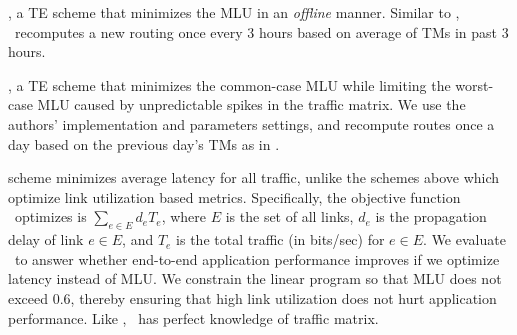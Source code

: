 {\bf{\mplsavg}}, a TE scheme that minimizes the MLU in an {\em offline} manner. Similar to \optwt, \mplsavg\ recomputes a new routing once every 3 hours based on average of TMs in past 3 hours.


{\bf{\cope}}, a TE scheme that minimizes the common-case MLU while limiting the worst-case MLU caused by unpredictable spikes in the traffic matrix. We use the authors' implementation and parameters settings, and recompute routes once a day based on the previous day's TMs  as in \cite{COPE}.


{\bf{\mindelay}} scheme minimizes average latency for all traffic, unlike the schemes above which optimize link utilization based metrics.
Specifically, the objective function \mindelay\ optimizes is $\sum_{e \in E} d_e T_e$, where $E$  is the set of all links, $d_e$ is the propagation delay of link $e \in E$, and $T_e$ is the total traffic (in bits/sec) for $e\in E$. 
We evaluate \mindelay\ to answer whether end-to-end application performance improves if we optimize latency instead of MLU.
We constrain the linear program so that MLU does not exceed 0.6, thereby ensuring that high link utilization does not hurt application performance.
Like \opt, \mindelay\ has perfect knowledge of traffic matrix.


  





